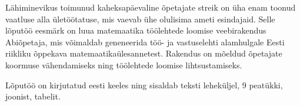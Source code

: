 Lähiminevikus toimunud kaheksapäevaline õpetajate streik on üha enam toonud vaatluse alla ületöötatuse, mis vaevab ühe olulisima ameti esindajaid. Selle lõputöö eesmärk on luua matemaatika töölehtede loomise veebirakendus Abiõpetaja, mis võimaldab geneneerida töö- ja vastuselehti alamhulgale Eesti riikliku õppekava matemaatikaülesannetest. Rakendus on mõeldud õpetajate koormuse vähendamiseks ning töölehtede loomise lihtsustamiseks.

Lõputöö on kirjutatud eesti keeles ning sisaldab teksti  leheküljel, 9 peatükki,  joonist,  tabelit.

